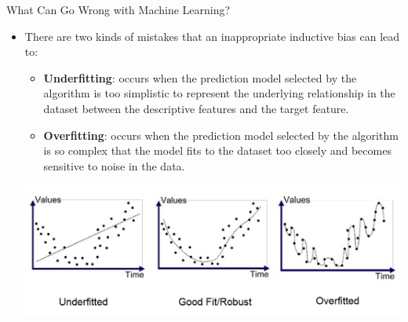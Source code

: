 \documentclass[aspectratio=169,xcolor=dvipsnames]{beamer}
\begin{document}
\begin{frame}{What Can Go Wrong with Machine Learning?}
\begin{itemize}
\setlength{\itemsep}{.25cm}

\item There are two kinds of mistakes that an inappropriate inductive bias can lead to:
	\begin{itemize}
	\item \textbf{Underfitting}: occurs when the prediction model selected by the algorithm is too simplistic to represent the underlying relationship in the dataset between the descriptive features and the target feature.
	\item \textbf{Overfitting}: occurs when the prediction model selected by the algorithm is so complex that the model fits to the dataset too closely and becomes sensitive to noise in the data.
	\end{itemize}
\begin{center}
\includegraphics[scale=0.3]{images/fitting.png}
\end{center}
\end{itemize}
\end{frame}

\end{document}
